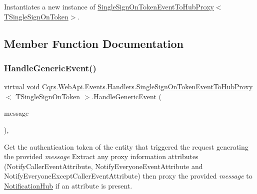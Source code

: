 Instantiates a new instance of \hyperlink{classCqrs_1_1WebApi_1_1Events_1_1Handlers_1_1SingleSignOnTokenEventToHubProxy_ad54ad4efb19787dbf07287bf1fa7816b_ad54ad4efb19787dbf07287bf1fa7816b}{Single\+Sign\+On\+Token\+Event\+To\+Hub\+Proxy$<$\+T\+Single\+Sign\+On\+Token$>$}. 



\subsection{Member Function Documentation}
\mbox{\label{classCqrs_1_1WebApi_1_1Events_1_1Handlers_1_1SingleSignOnTokenEventToHubProxy_ad8ecdd318f7dc37de14760879fd52668_ad8ecdd318f7dc37de14760879fd52668}} 
\subsubsection{\texorpdfstring{Handle\+Generic\+Event()}{HandleGenericEvent()}}
{\footnotesize\ttfamily virtual void \hyperlink{classCqrs_1_1WebApi_1_1Events_1_1Handlers_1_1SingleSignOnTokenEventToHubProxy}{Cqrs.\+Web\+Api.\+Events.\+Handlers.\+Single\+Sign\+On\+Token\+Event\+To\+Hub\+Proxy}$<$ T\+Single\+Sign\+On\+Token $>$.Handle\+Generic\+Event (\begin{DoxyParamCaption}\item[{\hyperlink{interfaceCqrs_1_1Events_1_1IEvent}{I\+Event}$<$ T\+Single\+Sign\+On\+Token $>$}]{message }\end{DoxyParamCaption})\hspace{0.3cm}{\ttfamily [protected]}, {\ttfamily [virtual]}}



Get the authentication token of the entity that triggered the request generating the provided {\itshape message}  Extract any proxy information attributes (Notify\+Caller\+Event\+Attribute, Notify\+Everyone\+Event\+Attribute and Notify\+Everyone\+Except\+Caller\+Event\+Attribute) then proxy the provided {\itshape message}  to \hyperlink{classCqrs_1_1WebApi_1_1Events_1_1Handlers_1_1SingleSignOnTokenEventToHubProxy_a9621749560e567a6252f3d7e2328174d_a9621749560e567a6252f3d7e2328174d}{Notification\+Hub} if an attribute is present. 


